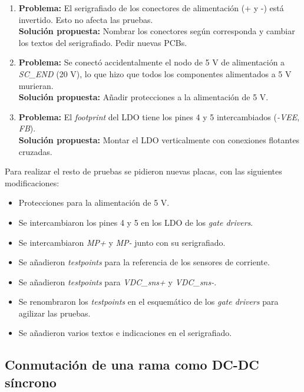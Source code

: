 \begin{enumerate}
	\item \textbf{Problema:} El serigrafiado de los conectores de alimentación (+ y -) está invertido. Esto no afecta las pruebas. \\
	\textbf{Solución propuesta:} Nombrar los conectores según corresponda y cambiar los textos del serigrafiado. Pedir nuevas PCBs.
	
	\item \textbf{Problema:} Se conectó accidentalmente el nodo de 5 V de alimentación a \textit{SC\_END} (20 V), lo  que hizo que todos los componentes alimentados a 5 V murieran.\\
	\textbf{Solución propuesta:} Añadir protecciones a la alimentación de 5 V.
	
	\item\textbf{Problema:} El \textit{footprint} del LDO tiene los pines 4 y 5 intercambiados (\textit{-VEE}, \textit{FB}). \\
	\textbf{Solución propuesta:} Montar el LDO verticalmente con conexiones flotantes cruzadas.
\end{enumerate}

Para realizar el resto de pruebas se pidieron nuevas placas, con las siguientes modificaciones:

\begin{itemize}
	\item Protecciones para la alimentación de 5 V.
	\item Se intercambiaron los pines 4 y 5 en los LDO de los \textit{gate drivers}.
	\item Se intercambiaron \textit{MP+} y \textit{MP-} junto con su serigrafiado.
	\item Se añadieron \textit{testpoints} para la referencia de los sensores de corriente.
	\item Se añadieron \textit{testpoints} para \textit{VDC\_sns+} y \textit{VDC\_sns-}.
	\item Se renombraron los \textit{testpoints} en el esquemático de los \textit{gate drivers} para agilizar las pruebas.
	\item Se añadieron varios textos e indicaciones en el serigrafiado.
\end{itemize}

\subsection{Conmutación de una rama como DC-DC síncrono}

